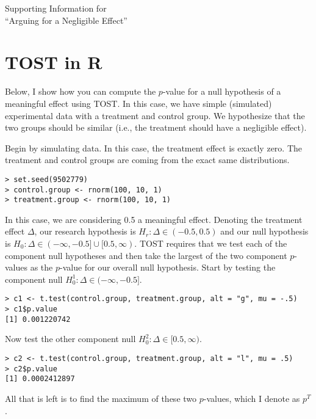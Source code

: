 \documentclass[12pt]{article}
\begin{document}
\begin{center}
{\LARGE Supporting Information for\\``Arguing for a Negligible Effect''}\\\vspace{2mm}
\end{center}

\section*{TOST in R}

Below, I show how you can compute the $p$-value for a null hypothesis of a meaningful effect using TOST. In this case, we have simple (simulated) experimental data with a treatment and control group. We hypothesize that the two groups should be similar (i.e., the treatment should have a negligible effect). 

Begin by simulating data. In this case, the treatment effect is exactly zero. The treatment and control groups are coming from the exact same distributions.

\begin{verbatim}
> set.seed(9502779)
> control.group <- rnorm(100, 10, 1)
> treatment.group <- rnorm(100, 10, 1)
\end{verbatim}

In this case, we are considering 0.5 a meaningful effect. Denoting the treatment effect $\Delta$, our research hypothesis is $H_r: \Delta \in (-0.5, 0.5)$ and our null hypothesis is $H_0 : \Delta \in (-\infty, -0.5]\cup[0.5, \infty)$. TOST requires that we test each of the component null hypotheses and then take the largest of the two component $p$-values as the $p$-value for our overall null hypothesis. Start by testing the component null $H^1_0 : \Delta \in (-\infty, -0.5]$.

\begin{verbatim}
> c1 <- t.test(control.group, treatment.group, alt = "g", mu = -.5)
> c1$p.value
[1] 0.001220742
\end{verbatim}

\noindent Now test the other component null $H^2_0 : \Delta \in [0.5, \infty)$.

\begin{verbatim}
> c2 <- t.test(control.group, treatment.group, alt = "l", mu = .5)
> c2$p.value
[1] 0.0002412897
\end{verbatim}

\noindent All that is left is to find the maximum of these two $p$-values, which I denote as $p^T$.
\end{document}
